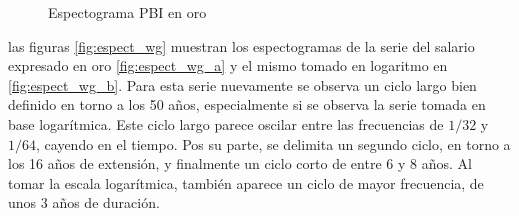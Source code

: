 \documentclass[a4paper]{article}
\begin{document}
\begin{figure}[H]
	\centering
	\caption{Espectograma PBI en oro} \label{fig:espect_PBI}
\end{figure}

las figuras \ref{fig:espect_wg} muestran los espectogramas de la serie del salario expresado en oro \ref{fig:espect_wg_a} y el mismo tomado en logaritmo en \ref{fig:espect_wg_b}. Para esta serie nuevamente se observa un ciclo largo bien definido en torno a los 50 años, especialmente si se observa la serie tomada en base logarítmica. Este ciclo largo parece oscilar entre las frecuencias de $1/32$ y $1/64$, cayendo en el tiempo. Pos su parte, se delimita un segundo ciclo, en torno a los 16 años de extensión, y finalmente un ciclo corto de entre 6 y 8 años.  Al tomar la escala logarítmica, también aparece un ciclo de mayor frecuencia, de unos 3 años de duración. 
\end{document}
